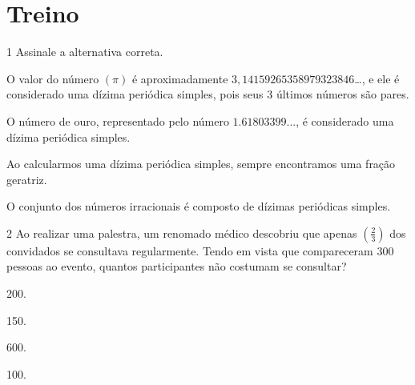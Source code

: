 \section*{Treino}

\num{1} Assinale a alternativa correta.

\begin{escolha}[itemsep=0pt]
\item O valor do número $(\pi)$ é aproximadamente
$3,14159265358979323846$\ldots, e ele é considerado uma dízima periódica
simples, pois seus 3 últimos números são pares.
\item O número de ouro, representado pelo número $1.61803399$..., é considerado
uma dízima periódica simples.
\item Ao calcularmos uma dízima periódica simples, sempre encontramos uma
fração geratriz.
\item O conjunto dos números irracionais é composto de dízimas periódicas
simples.
\end{escolha}







\num{2} Ao realizar uma palestra, um renomado médico descobriu que apenas
$(\frac{2}{3})$ dos convidados se consultava regularmente. Tendo em
vista que compareceram 300 pessoas ao evento, quantos participantes não
costumam se consultar?

\begin{escolha}[itemsep=0pt]
\item 200.
\item 150.
\item 600.
\item 100.
\end{escolha}


